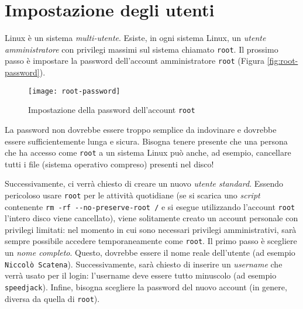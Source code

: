 \section{Impostazione degli utenti}
Linux è un sistema \textit{multi-utente}. Esiste, in ogni sistema Linux, un \textit{utente amministratore} con privilegi massimi sul sistema chiamato \texttt{root}. Il prossimo passo è impostare la password dell'account amministratore \texttt{root} (Figura \vref{fig:root-password}).

\begin{figure}[ht]
	\centering
	\texttt{[image: root-password]}
	\caption{Impostazione della password dell'account \texttt{root}}
	\label{fig:root-password}
\end{figure}

La password non dovrebbe essere troppo semplice da indovinare e dovrebbe essere sufficientemente lunga e sicura. Bisogna tenere presente che una persona che ha accesso come \texttt{root} a un sistema Linux può anche, ad esempio, cancellare tutti i file (sistema operativo compreso) presenti nel disco!

Successivamente, ci verrà chiesto di creare un nuovo \textit{utente standard}. Essendo pericoloso usare \texttt{root} per le attività quotidiane (se si scarica uno \textit{script} contenente \texttt{rm -rf -{}-no-preserve-root /} e si esegue utilizzando l'account \texttt{root} l'intero disco viene cancellato), viene solitamente creato un account personale con privilegi limitati: nel momento in cui sono necessari privilegi amministrativi, sarà sempre possibile accedere temporaneamente come \texttt{root}. Il primo passo è scegliere un \textit{nome completo}. Questo, dovrebbe essere il nome reale dell'utente (ad esempio \texttt{Niccolò Scatena}). Successivamente, sarà chiesto di inserire un \textit{username} che verrà usato per il login: l'username deve essere tutto minuscolo (ad esempio \texttt{speedjack}). Infine, bisogna scegliere la password del nuovo account (in genere, diversa da quella di \texttt{root}).
